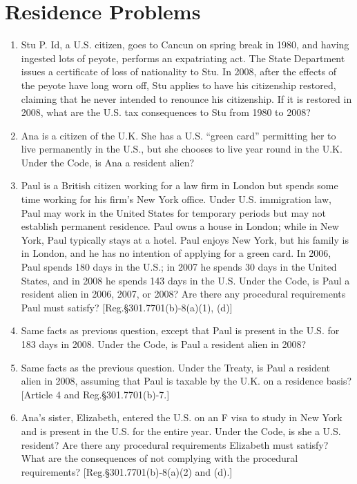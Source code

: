 \section{Residence Problems}
\begin{enumerate}
 
 	\item Stu P. Id, a U.S. citizen, goes to Cancun on spring break in 1980, and having ingested lots of peyote, performs an expatriating act.  The State Department issues a certificate of loss of nationality to Stu.  In 2008, after the effects of the peyote have long worn off, Stu applies to have his citizenship restored, claiming that he never intended to renounce his citizenship.  If it is restored in 2008, what are the U.S. tax consequences to Stu from 1980 to 2008?
	
	\item Ana is a citizen of the U.K.  She has a U.S. ``green card'' permitting her to live permanently in the U.S., but she chooses to live year round in the U.K.  Under the Code, is Ana a resident alien?
	
	\item Paul is a British citizen working for a law firm in London but spends some time working for his firm's New York office.  Under U.S. immigration law, Paul may work in the United States for temporary periods but may not establish permanent residence.  Paul owns a house in London; while in New York, Paul typically stays at a hotel.  Paul enjoys New York, but his family is in London, and he has no intention of applying for a green card.  In 2006, Paul spends 180 days in the U.S.; in 2007 he spends 30 days in the United States, and in 2008 he spends 143 days in the U.S.  Under the Code, is Paul a resident alien in 2006, 2007, or 2008?  Are there any procedural requirements Paul must satisfy? [Reg.\@ \S 301.7701(b)-8(a)(1), (d)]
	
	\item Same facts as previous question, except that Paul is present in the U.S. for 183 days in 2008.  Under the Code, is Paul a resident alien in 2008?
	
	\item Same facts as the previous question.  Under the Treaty, is Paul a resident alien in 2008, assuming that Paul is taxable by the U.K. on a residence basis? [Article 4 and Reg.\@ \S 301.7701(b)-7.]
	
	\item Ana's sister, Elizabeth, entered the U.S. on an F visa to study in New York and is present in the U.S. for the entire year.  Under the Code, is she a U.S. resident?  Are there any procedural requirements Elizabeth must satisfy?  What are the consequences of not complying with the procedural requirements? [Reg.\@ \S 301.7701(b)-8(a)(2) and (d).]
	

\end{enumerate}
